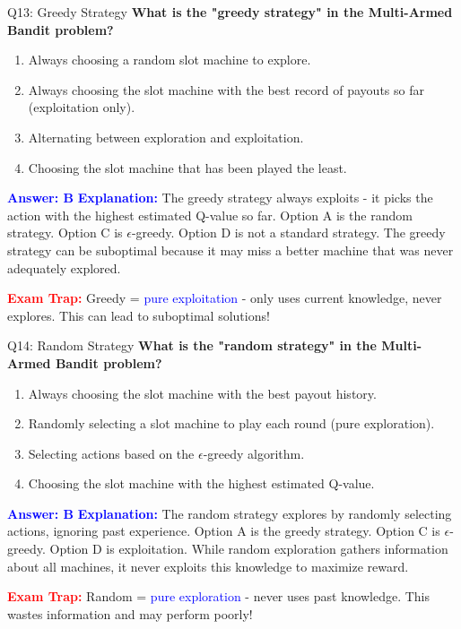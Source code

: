 \documentclass[8pt]{beamer}
\begin{document}
	\begin{frame}{Q13: Greedy Strategy}
		\fontsize{6.5}{7.5}\selectfont
		\textbf{What is the "greedy strategy" in the Multi-Armed Bandit problem?}
		
		\begin{enumerate}
			\item Always choosing a random slot machine to explore.
			\item Always choosing the slot machine with the best record of payouts so far (exploitation only).
			\item Alternating between exploration and exploitation.
			\item Choosing the slot machine that has been played the least.
		\end{enumerate}
		
		\vspace{0.1cm}
		\textcolor{blue}{\textbf{Answer: B}}
		\vspace{0.1cm}
		\textcolor{blue}{\textbf{Explanation:}} The greedy strategy always exploits - it picks the action with the highest estimated Q-value so far. Option A is the random strategy. Option C is $\epsilon$-greedy. Option D is not a standard strategy. The greedy strategy can be suboptimal because it may miss a better machine that was never adequately explored.
		
		\textcolor{red}{\textbf{Exam Trap:}} Greedy = \textcolor{blue}{pure exploitation} - only uses current knowledge, never explores. This can lead to suboptimal solutions!
	\end{frame}
	
	\begin{frame}{Q14: Random Strategy}
		\fontsize{6.5}{7.5}\selectfont
		\textbf{What is the "random strategy" in the Multi-Armed Bandit problem?}
		
		\begin{enumerate}
			\item Always choosing the slot machine with the best payout history.
			\item Randomly selecting a slot machine to play each round (pure exploration).
			\item Selecting actions based on the $\epsilon$-greedy algorithm.
			\item Choosing the slot machine with the highest estimated Q-value.
		\end{enumerate}
		
		\vspace{0.1cm}
		\textcolor{blue}{\textbf{Answer: B}}
		\vspace{0.1cm}
		\textcolor{blue}{\textbf{Explanation:}} The random strategy explores by randomly selecting actions, ignoring past experience. Option A is the greedy strategy. Option C is $\epsilon$-greedy. Option D is exploitation. While random exploration gathers information about all machines, it never exploits this knowledge to maximize reward.
		
		\textcolor{red}{\textbf{Exam Trap:}} Random = \textcolor{blue}{pure exploration} - never uses past knowledge. This wastes information and may perform poorly!
	\end{frame}
	
\end{document}
